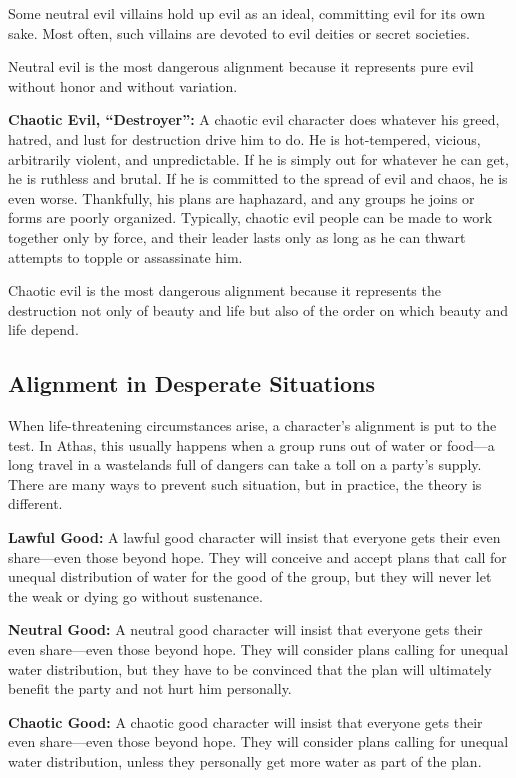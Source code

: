 Some neutral evil villains hold up evil as an ideal, committing evil for its own sake. Most often, such villains are devoted to evil deities or secret societies.

Neutral evil is the most dangerous alignment because it represents pure evil without honor and without variation.

\textbf{Chaotic Evil, ``Destroyer'':} A chaotic evil character does whatever his greed, hatred, and lust for destruction drive him to do. He is hot-tempered, vicious, arbitrarily violent, and unpredictable. If he is simply out for whatever he can get, he is ruthless and brutal. If he is committed to the spread of evil and chaos, he is even worse. Thankfully, his plans are haphazard, and any groups he joins or forms are poorly organized. Typically, chaotic evil people can be made to work together only by force, and their leader lasts only as long as he can thwart attempts to topple or assassinate him.

Chaotic evil is the most dangerous alignment because it represents the destruction not only of beauty and life but also of the order on which beauty and life depend.

\subsection{Alignment in Desperate Situations}
When life-threatening circumstances arise, a character's alignment is put to the test. In Athas, this usually happens when a group runs out of water or food---a long travel in a wastelands full of dangers can take a toll on a party's supply. There are many ways to prevent such situation, but in practice, the theory is different.

\textbf{Lawful Good:} A lawful good character will insist that everyone gets their even share---even those beyond hope. They will conceive and accept plans that call for unequal distribution of water for the good of the group, but they will never let the weak or dying go without sustenance.

\textbf{Neutral Good:} A neutral good character will insist that everyone gets their even share---even those beyond hope. They will consider plans calling for unequal water distribution, but they have to be convinced that the plan will ultimately benefit the party and not hurt him personally.

\textbf{Chaotic Good:} A chaotic good character will insist that everyone gets their even share---even those beyond hope. They will consider plans calling for unequal water distribution, unless they personally get more water as part of the plan.


